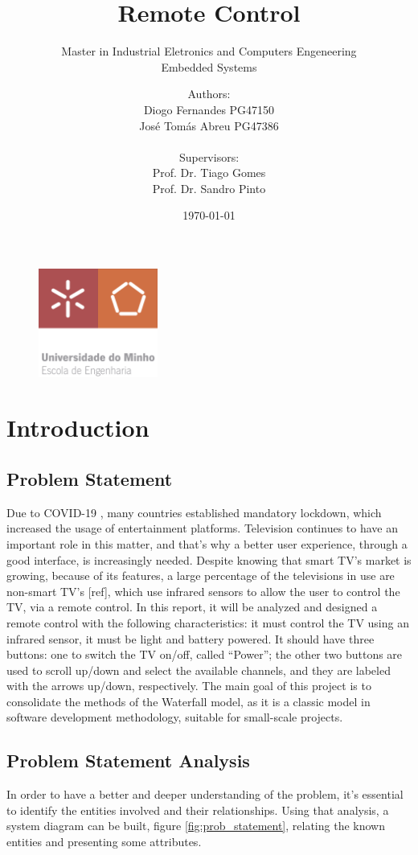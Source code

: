 \documentclass[12pt, letterpaper]{report}
\title{\textbf{Remote Control}}
\subtitle{{\large Master in Industrial Eletronics and Computers Engeneering} \\ {\large Embedded Systems}}
\author{Authors:\\Diogo Fernandes PG47150\\José Tomás Abreu PG47386\\ \\ Supervisors:\\Prof. Dr. Tiago Gomes\\Prof. Dr. Sandro Pinto}
\date{\today}
\begin{document}
{\begin{figure}[t]
	\centering
	\includegraphics[width=0.35\textwidth]{EEUMLOGO}
	\end{figure}}

\maketitle

\tableofcontents
\clearpage
\chapter{Introduction}
\section{Problem Statement}
Due to COVID-19 \cite{covid}, many countries established mandatory lockdown, which increased the usage of entertainment platforms. Television continues to have an important role in this matter, and that’s why a better user experience, through a good interface, is increasingly needed.
Despite knowing that smart TV’s market is growing, because of its features, a large percentage of the televisions in use are non-smart TV’s [ref], which use infrared sensors to allow the user to control the TV, via a remote control. In this report, it will be analyzed and designed a remote control with the following characteristics: it must control the TV using an infrared sensor, it must be light and battery powered. It should have three buttons: one to switch the TV on/off, called “Power”; the other two buttons are used to scroll up/down and select the available channels, and they are labeled with the arrows up/down, respectively. The main goal of this project is to consolidate the methods of the Waterfall model, as it is a classic model in software development methodology, suitable for small-scale projects.

\section{Problem Statement Analysis}
In order to have a better and deeper understanding of the problem, it’s essential to identify the entities involved and their relationships. Using that analysis, a system diagram can be built, figure \ref{fig:prob_statement}, relating the known entities and presenting some attributes.
\end{document}
